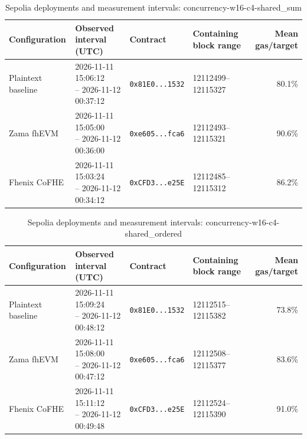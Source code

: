 \begin{table}[!t]
\caption{Sepolia deployments and measurement intervals: concurrency-w16-c4-shared\_sum}
\label{tab:sepolia-concurrency-w16-c4-shared-sum}
\centering
\footnotesize
\setlength{\tabcolsep}{4pt}
\begin{tabular}{|l|l|l|l|r|}
\hline
\textbf{Configuration} & \textbf{Observed interval (UTC)} & \textbf{Contract} & \textbf{Containing block range} & \textbf{Mean gas/target} \\
\hline
Plaintext baseline & \shortstack[l]{2026-11-11 15:06:12 \\ -- 2026-11-12 00:37:12} & \texttt{0x81E0...1532} & 12112499--12115327 & 80.1\% \\
\hline
Zama fhEVM & \shortstack[l]{2026-11-11 15:05:00 \\ -- 2026-11-12 00:36:00} & \texttt{0xe605...fca6} & 12112493--12115321 & 90.6\% \\
\hline
Fhenix CoFHE & \shortstack[l]{2026-11-11 15:03:24 \\ -- 2026-11-12 00:34:12} & \texttt{0xCFD3...e25E} & 12112485--12115312 & 86.2\% \\
\hline
\end{tabular}
\end{table}

\begin{table}[!t]
\caption{Sepolia deployments and measurement intervals: concurrency-w16-c4-shared\_ordered}
\label{tab:sepolia-concurrency-w16-c4-shared-ordered}
\centering
\footnotesize
\setlength{\tabcolsep}{4pt}
\begin{tabular}{|l|l|l|l|r|}
\hline
\textbf{Configuration} & \textbf{Observed interval (UTC)} & \textbf{Contract} & \textbf{Containing block range} & \textbf{Mean gas/target} \\
\hline
Plaintext baseline & \shortstack[l]{2026-11-11 15:09:24 \\ -- 2026-11-12 00:48:12} & \texttt{0x81E0...1532} & 12112515--12115382 & 73.8\% \\
\hline
Zama fhEVM & \shortstack[l]{2026-11-11 15:08:00 \\ -- 2026-11-12 00:47:12} & \texttt{0xe605...fca6} & 12112508--12115377 & 83.6\% \\
\hline
Fhenix CoFHE & \shortstack[l]{2026-11-11 15:11:12 \\ -- 2026-11-12 00:49:48} & \texttt{0xCFD3...e25E} & 12112524--12115390 & 91.0\% \\
\hline
\end{tabular}
\end{table}

